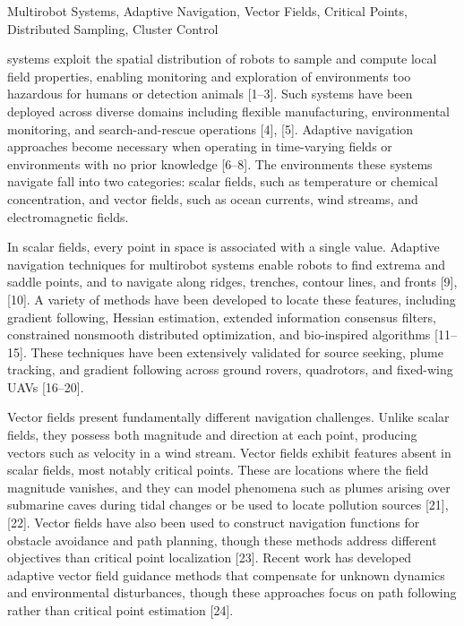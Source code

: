 \documentclass[lettersize,journal]{IEEEtran}
\begin{document}
\begin{IEEEkeywords}
Multirobot Systems, Adaptive Navigation, Vector Fields, Critical Points, Distributed Sampling, Cluster Control
\end{IEEEkeywords}

 systems exploit the spatial distribution of robots to sample and compute local field properties, enabling monitoring and exploration of environments too hazardous for humans or detection animals [1--3]. Such systems have been deployed across diverse domains including flexible manufacturing, environmental monitoring, and search-and-rescue operations [4], [5]. Adaptive navigation approaches become necessary when operating in time-varying fields or environments with no prior knowledge [6--8]. The environments these systems navigate fall into two categories: scalar fields, such as temperature or chemical concentration, and vector fields, such as ocean currents, wind streams, and electromagnetic fields.

In scalar fields, every point in space is associated with a single value. Adaptive navigation techniques for multirobot systems enable robots to find extrema and saddle points, and to navigate along ridges, trenches, contour lines, and fronts [9], [10]. A variety of methods have been developed to locate these features, including gradient following, Hessian estimation, extended information consensus filters, constrained nonsmooth distributed optimization, and bio-inspired algorithms [11--15]. These techniques have been extensively validated for source seeking, plume tracking, and gradient following across ground rovers, quadrotors, and fixed-wing UAVs  [16--20].

Vector fields present fundamentally different navigation challenges. Unlike scalar fields, they possess both magnitude and direction at each point, producing vectors such as velocity in a wind stream. Vector fields exhibit features absent in scalar fields, most notably critical points. These are locations where the field magnitude vanishes, and they can model phenomena such as plumes arising over submarine caves during tidal changes or be used to locate pollution sources [21], [22]. Vector fields have also been used to construct navigation functions for obstacle avoidance and path planning, though these methods address different objectives than critical point localization [23]. Recent work has developed adaptive vector field guidance methods that compensate for unknown dynamics and environmental disturbances, though these approaches focus on path following rather than critical point estimation [24].
\end{document}
